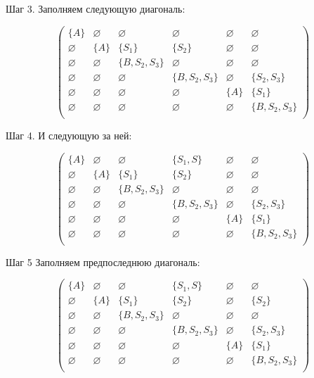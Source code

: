 \begin{example}
Шаг 3. Заполняем следующую диагональ:

\[
\begin{pmatrix}
\{A\}       & \varnothing & \varnothing    & \varnothing      & \varnothing & \varnothing    \\
\varnothing & \{A\}       & \{S_1\}            & \{S_2\}          & \varnothing & \varnothing    \\
\varnothing & \varnothing & \{B, S_2, S_3\} & \varnothing     & \varnothing & \varnothing    \\
\varnothing & \varnothing & \varnothing    & \{B, S_2, S_3\}   & \varnothing & \{S_2, S_3\}  \\
\varnothing & \varnothing & \varnothing    & \varnothing      & \{A\}       & \{S_1\}            \\
\varnothing & \varnothing & \varnothing    & \varnothing      & \varnothing & \{B, S_2, S_3\} \\
\end{pmatrix}
\]

Шаг 4. И следующую за ней:

\[
\begin{pmatrix}
\{A\}       & \varnothing & \varnothing    & \{S_1, S\}       & \varnothing & \varnothing    \\
\varnothing & \{A\}       & \{S_1\}            & \{S_2\}          & \varnothing & \varnothing    \\
\varnothing & \varnothing & \{B, S_2, S_3\} & \varnothing     & \varnothing & \varnothing    \\
\varnothing & \varnothing & \varnothing    & \{B, S_2, S_3\}   & \varnothing & \{S_2, S_3\}  \\
\varnothing & \varnothing & \varnothing    & \varnothing      & \{A\}       & \{S_1\}            \\
\varnothing & \varnothing & \varnothing    & \varnothing      & \varnothing & \{B, S_2, S_3\} \\
\end{pmatrix}
\]

Шаг 5 Заполняем предпоследнюю диагональ:

\[
\begin{pmatrix}
\{A\}       & \varnothing & \varnothing    & \{S_1, S\}       & \varnothing & \varnothing    \\
\varnothing & \{A\}       & \{S_1\}            & \{S_2\}          & \varnothing & \{S_2\}        \\
\varnothing & \varnothing & \{B, S_2, S_3\} & \varnothing     & \varnothing & \varnothing    \\
\varnothing & \varnothing & \varnothing    & \{B, S_2, S_3\}   & \varnothing & \{S_2, S_3\}  \\
\varnothing & \varnothing & \varnothing    & \varnothing      & \{A\}       & \{S_1\}            \\
\varnothing & \varnothing & \varnothing    & \varnothing      & \varnothing & \{B, S_2, S_3\} \\
\end{pmatrix}
\]


\end{example}
